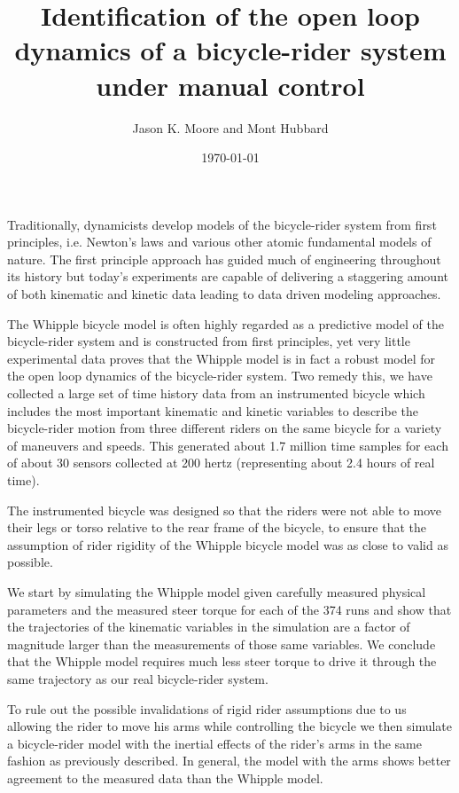 \documentclass{article}
\title{Identification of the open loop dynamics of a bicycle-rider system
under manual control}
\author{Jason K. Moore and Mont Hubbard}
\date{\today}
\begin{document}
\maketitle

Traditionally, dynamicists develop models of the bicycle-rider system from
first principles, i.e. Newton's laws and various other atomic fundamental
models of nature. The first principle approach has guided much of engineering
throughout its history but today's experiments are capable of delivering a
staggering amount of both kinematic and kinetic data leading to data driven
modeling approaches.

The Whipple bicycle model is often highly regarded as a predictive model of
the bicycle-rider system and is constructed from first principles, yet very
little experimental data proves that the Whipple model is in fact a robust
model for the open loop dynamics of the bicycle-rider system. Two remedy this,
we have collected a large set of time history data from an instrumented bicycle
which includes the most important kinematic and kinetic variables to describe
the bicycle-rider motion from three different riders on the same bicycle for a
variety of maneuvers and speeds. This generated about 1.7 million time samples
for each of about 30 sensors collected at 200 hertz (representing about 2.4
hours of real time).

The instrumented bicycle was designed so that the riders were not able to move
their legs or torso relative to the rear frame of the bicycle, to ensure that
the assumption of rider rigidity of the Whipple bicycle model was as close to
valid as possible.

We start by simulating the Whipple model given carefully measured physical
parameters and the measured steer torque for each of the 374 runs and show that
the trajectories of the kinematic variables in the simulation are a factor of
magnitude larger than the measurements of those same variables. We conclude
that the Whipple model requires much less steer torque to drive it through the
same trajectory as our real bicycle-rider system.

To rule out the possible invalidations of rigid rider assumptions due to us
allowing the rider to move his arms while controlling the bicycle we then
simulate a bicycle-rider model with the inertial effects of the rider's arms in
the same fashion as previously described. In general, the model with the arms
shows better agreement to the measured data than the Whipple model.
\end{document}
